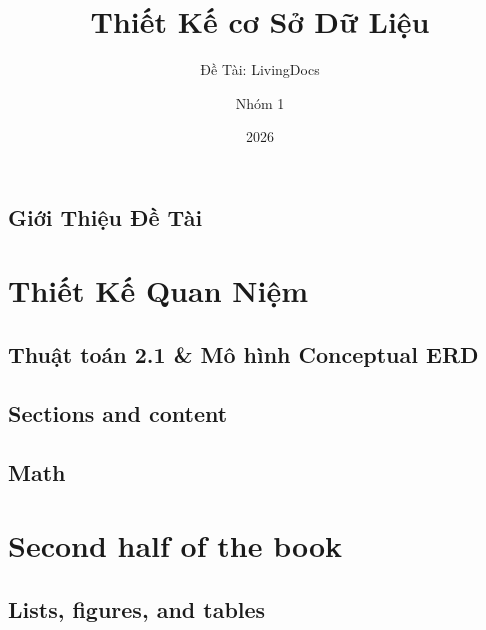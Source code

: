 \documentclass[letterpaper,11pt,leqno]{book}
\begin{document}
\title{Thiết Kế cơ Sở Dữ Liệu}

\subtitle{Đề Tài: LivingDocs}

\author{Nhóm 1}

\date{2026}

\begin{titlepage}
\maketitle
\end{titlepage}

\frontmatter

\tableofcontents

\chapter{Giới Thiệu Đề Tài}



\mainmatter

\part{Thiết Kế Quan Niệm }\label{p:first}

\chapter{Thuật toán 2.1  \& Mô hình Conceptual ERD}\label{c:task_1}



\chapter{Sections and content}\label{c:section}



\chapter{Math}\label{c:math}



\part{Second half of the book}\label{p:second}

\chapter{Lists, figures, and tables}\label{c:figures}
\end{document}
